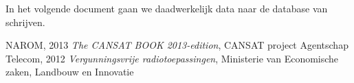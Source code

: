 In het volgende document gaan we daadwerkelijk data naar de database van \hisparc schrijven. 

\begin{thebibliography}{9}
        NAROM, 2013 \emph{The CANSAT BOOK 2013-edition}, 
        CANSAT project
    Agentschap Telecom, 2012 \emph{Vergunningsvrije radiotoepassingen}, 
    Ministerie van Economische zaken, Landbouw en Innovatie
\end{thebibliography}



